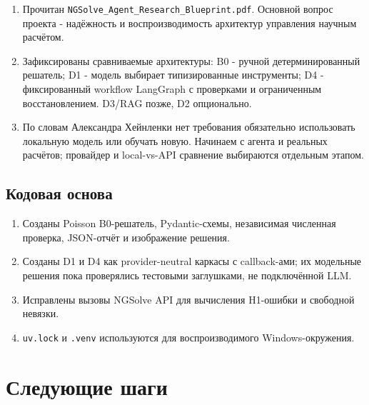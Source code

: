 \documentclass[11pt,a4paper]{article}
\begin{document}
\begin{enumerate}
    \item Прочитан \texttt{NGSolve\_Agent\_Research\_Blueprint.pdf}. Основной вопрос проекта - надёжность и воспроизводимость архитектур управления научным расчётом.
    \item Зафиксированы сравниваемые архитектуры: B0 - ручной детерминированный решатель; D1 - модель выбирает типизированные инструменты; D4 - фиксированный workflow LangGraph с проверками и ограниченным восстановлением. D3/RAG позже, D2 опционально.
    \item По словам Александра Хейнленки нет требования обязательно использовать локальную модель или обучать новую. Начинаем с агента и реальных расчётов; провайдер и local-vs-API сравнение выбираются отдельным этапом.
\end{enumerate}

\subsection{Кодовая основа}

\begin{enumerate}
    \item Созданы Poisson B0-решатель, Pydantic-схемы, независимая численная проверка, JSON-отчёт и изображение решения.
    \item Созданы D1 и D4 как provider-neutral каркасы с callback-ами; их модельные решения пока проверялись тестовыми заглушками, не подключённой LLM.
    \item Исправлены вызовы NGSolve API для вычисления H1-ошибки и свободной невязки.
    \item \texttt{uv.lock} и \texttt{.venv} используются для воспроизводимого Windows-окружения.
\end{enumerate}

\section{Следующие шаги}
\end{document}
